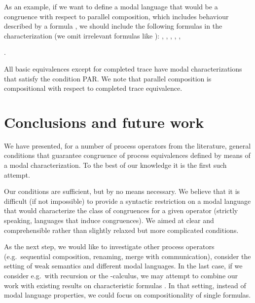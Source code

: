 \documentclass{eptcs}
\begin{document}
As an example, if we want to define a modal language that would be a congruence with respect to parallel composition, which includes behaviour described by a formula , we should include the following formulas in the characterization (we omit irrelevant formulas like ): 
,
,
,
,
,

.

All basic equivalences except for completed trace have modal characterizations that satisfy the condition PAR. We note that parallel composition is compositional with respect to completed trace equivalence.

\section{Conclusions and future work}

We have presented, for a number of process operators from the literature, general conditions that guarantee congruence of process equivalences defined by means of a modal characterization. To the best of our knowledge it is the first such attempt.

Our conditions are sufficient, but by no means necessary. We believe that it is difficult (if not impossible) to provide a syntactic restriction on a modal language that would characterize the class of congruences for a given operator (strictly speaking, languages that induce congruences). We aimed at clear and comprehensible rather than slightly relaxed but more complicated conditions.

As the next step, we would like to investigate other process operators (e.g.\ sequential composition, renaming, merge with communication), consider the setting of weak semantics and different modal languages. In the last case, if we consider e.g.\  with recursion or the -calculus, we may attempt to combine our work with existing results on characteristic formulas \cite{AcInSa09}. In that setting, instead of modal language properties, we could focus on compositionality of single formulas.
\end{document}
